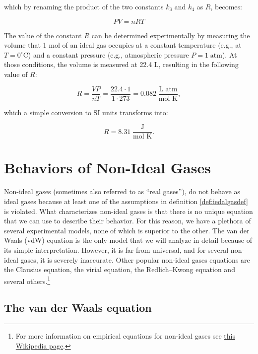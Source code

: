 \documentclass[
  9pt,
]{extbook}
\theoremstyle{definition}
\theoremstyle{definition}
\theoremstyle{definition}
\theoremstyle{remark}
\begin{document}
which by renaming the product of the two constants \(k_3\) and \(k_4\) as \(R\), becomes:

\begin{equation}
PV=nRT
\label{eq:ideallaw2}
\end{equation}

The value of the constant \(R\) can be determined experimentally by measuring the volume that 1 mol of an ideal gas occupies at a constant temperature (e.g., at \(T=0^\circ\mathrm{C}\)) and a constant pressure (e.g., atmospheric pressure \(P=1\;\mathrm{atm}\)). At those conditions, the volume is measured at 22.4 L, resulting in the following value of \(R\):

\begin{equation}
R=\frac{VP}{nT}=\frac{22.4 \cdot 1}{1 \cdot 273}=0.082 \;\frac{\text{L atm}}{\text{mol K}},
\label{eq:ideallaw3}
\end{equation}

which a simple conversion to SI units transforms into:

\begin{equation}
R=8.31\;\frac{\text{J}}{\text{mol K}}.
\label{eq:RvalueSI}
\end{equation}

\hypertarget{behaviors-of-non-ideal-gases}{%
\section{Behaviors of Non-Ideal Gases}\label{behaviors-of-non-ideal-gases}}

Non-ideal gases (sometimes also referred to as ``real gases''), do not behave as ideal gases because at least one of the assumptions in definition \ref{def:iedalgasdef} is violated. What characterizes non-ideal gases is that there is no unique equation that we can use to describe their behavior. For this reason, we have a plethora of several experimental models, none of which is superior to the other. The van der Waals (vdW) equation is the only model that we will analyze in detail because of its simple interpretation. However, it is far from universal, and for several non-ideal gases, it is severely inaccurate. Other popular non-ideal gases equations are the Clausius equation, the virial equation, the Redlich--Kwong equation and several others.\footnote{For more information on empirical equations for non-ideal gases see \href{https://en.wikipedia.org/wiki/Real_gas}{this Wikipedia page}.}

\hypertarget{the-van-der-waals-equation}{%
\subsection{The van der Waals equation}\label{the-van-der-waals-equation}}
\end{document}
